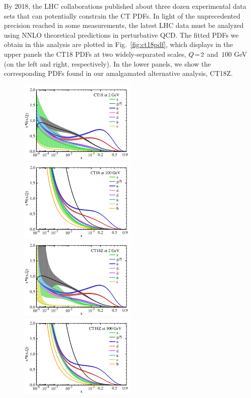 By 2018, the LHC collaborations published
about three dozen experimental data sets that can potentially constrain 
the CT PDFs. In light of the unprecedented precision reached in some 
measurements, the latest LHC data must be analyzed using
NNLO theoretical predictions in perturbative QCD.
%
The fitted PDFs we obtain in this analysis are plotted in Fig.~\ref{fig:ct18pdf},
which displays in the upper panels the CT18 PDFs at two widely-separated scales,
$Q\!=\!2$ and $\,100$ GeV (on the left and right, respectively). In the lower panels,
we show the corresponding PDFs found in our amalgamated alternative analysis,
CT18Z.

%
\begin{figure}[htbp]
	\hspace*{-0.9cm}\includegraphics[width=0.52\textwidth]{./fig/pdfs_CT18___2GeV_Epdfs_cus-lin_ect.pdf}
	\includegraphics[width=0.52\textwidth]{./fig/pdfs_CT18_100GeV_Epdfs_cus-lin_ect.pdf}
	\hspace*{-0.9cm}\includegraphics[width=0.52\textwidth]{./fig/pdfs_CT18ZNNLO___2GeV_A90CL_Epdfs_cus-lin-d5_ect.pdf}
	\includegraphics[width=0.52\textwidth]{./fig/pdfs_CT18ZNNLO_100GeV_A90CL_Epdfs_cus-lin-d5_ect.pdf}

\end{figure}
